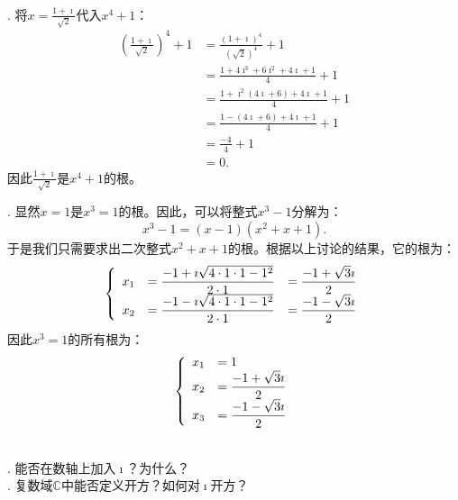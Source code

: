 \documentclass[12pt,UTF8,fontset=none]{ctexbook}
\begin{document}
\begin{so}
    \mbox{} \\
    . 将$x = \displaystyle\frac{1 + \imath}{\sqrt{2}}$代入$x^4 + 1$：
    \begin{align*}
        \left(\frac{1 + \imath}{\sqrt{2}}\right)^4 + 1 &= \frac{\left(1 + \imath\right)^4}{\left(\sqrt{2}\right)^4} + 1 \\
        &= \frac{1 + 4\imath^3 + 6\imath^2 + 4\imath + 1}{4} + 1 \\
        &= \frac{1 + \imath^2 (4\imath + 6) + 4\imath + 1}{4} + 1 \\
        &= \frac{1 - (4\imath + 6) + 4\imath + 1}{4} + 1 \\
        &= \frac{- 4}{4} + 1 \\
        &= 0.
    \end{align*}
    因此$\displaystyle\frac{1 + \imath}{\sqrt{2}}$是$x^4 + 1$的根。

    . 显然$x = 1$是$x^3 = 1$的根。因此，可以将整式$x^3 - 1$分解为：
    $$ x^3 - 1 = (x - 1)(x^2 + x + 1).$$
    于是我们只需要求出二次整式$x^2 + x + 1$的根。根据以上讨论的结果，它的根为：
    $$
    \left\{
        \begin{array}[]{rll}
            x_1 &= \displaystyle\frac{-1 + \imath \sqrt{4\cdot 1\cdot 1 - 1^2} }{2\cdot 1} &= \displaystyle\frac{-1 + \sqrt{3}\imath}{2} \\
            x_2 &= \displaystyle\frac{-1 - \imath \sqrt{4\cdot 1\cdot 1 - 1^2} }{2\cdot 1} &= \displaystyle\frac{-1 - \sqrt{3}\imath}{2} \\
        \end{array}
    \right.
    $$
    因此$x^3 = 1$的所有根为：
    $$
    \left\{
        \begin{array}[]{rl}
            x_1 &= 1 \\
            x_2 &= \displaystyle\frac{-1 + \sqrt{3}\imath}{2} \\
            x_3 &= \displaystyle\frac{-1 - \sqrt{3}\imath}{2} \\
        \end{array}
    \right.
    $$
\end{so}

\begin{sk}
    \mbox{} \\
    . 能否在数轴上加入$\imath$？为什么？\\
    . 复数域$\mathbb{C}$中能否定义开方？如何对$\imath$开方？
\end{sk}
\end{document}
